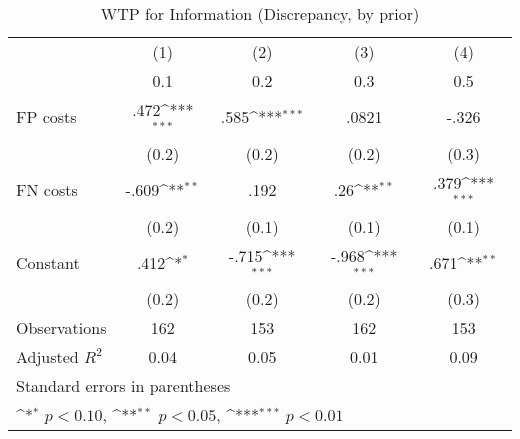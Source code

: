 \begin{table}[htbp]\centering
\def\sym#1{\ifmmode^{#1}\else\(^{#1}\)\fi}
\caption{WTP for Information (Discrepancy, by prior)}
\begin{tabular}{l*{4}{c}}
\hline\hline
                &\multicolumn{1}{c}{(1)}&\multicolumn{1}{c}{(2)}&\multicolumn{1}{c}{(3)}&\multicolumn{1}{c}{(4)}\\
                &\multicolumn{1}{c}{0.1}&\multicolumn{1}{c}{0.2}&\multicolumn{1}{c}{0.3}&\multicolumn{1}{c}{0.5}\\
\hline
FP costs        &     .472\sym{***}&     .585\sym{***}&    .0821         &    -.326         \\
                &    (0.2)         &    (0.2)         &    (0.2)         &    (0.3)         \\
FN costs        &    -.609\sym{**} &     .192         &      .26\sym{**} &     .379\sym{***}\\
                &    (0.2)         &    (0.1)         &    (0.1)         &    (0.1)         \\
Constant        &     .412\sym{*}  &    -.715\sym{***}&    -.968\sym{***}&     .671\sym{**} \\
                &    (0.2)         &    (0.2)         &    (0.2)         &    (0.3)         \\
\hline
Observations    &      162         &      153         &      162         &      153         \\
Adjusted \(R^{2}\)&     0.04         &     0.05         &     0.01         &     0.09         \\
\hline\hline
\multicolumn{5}{l}{\footnotesize Standard errors in parentheses}\\
\multicolumn{5}{l}{\footnotesize \sym{*} \(p<0.10\), \sym{**} \(p<0.05\), \sym{***} \(p<0.01\)}\\
\end{tabular}
\end{table}
